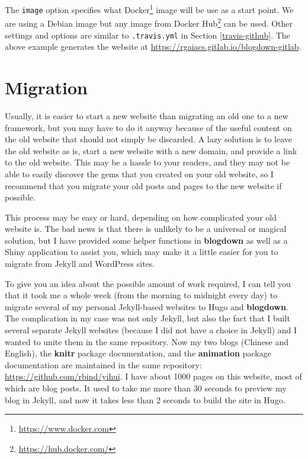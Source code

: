 \documentclass[12pt,]{krantz}
\renewcommand{\href}[2]{#2\footnote{\url{#1}}}
\theoremstyle{definition}
\theoremstyle{definition}
\theoremstyle{definition}
\theoremstyle{remark}
\begin{document}
The \texttt{image} option specifies what
\href{https://www.docker.com}{Docker} image will be use as a start
point. We are using a Debian image but any image from
\href{https://hub.docker.com/}{Docker Hub} can be used. Other settings
and options are similar to \texttt{.travis.yml} in Section
\ref{travis-github}. The above example generates the website at
\url{https://rgaiacs.gitlab.io/blogdown-gitlab}.

\chapter{Migration}\label{migration}

Usually, it is easier to start a new website than
migrating an old one to a new framework, but you
may have to do it anyway because of the useful content on the old
website that should not simply be discarded. A lazy solution is to leave
the old website as is, start a new website with a new domain, and
provide a link to the old website. This may be a hassle to your readers,
and they may not be able to easily discover the gems that you created on
your old website, so I recommend that you migrate your old posts and
pages to the new website if possible.

This process may be easy or hard, depending on how complicated your old
website is. The bad news is that there is unlikely to be a universal or
magical solution, but I have provided some helper functions in
\textbf{blogdown} as well as a Shiny application to assist you, which
may make it a little easier for you to migrate from Jekyll and WordPress
sites.

To give you an idea about the possible amount of work required, I can
tell you that it took me a whole week (from the morning to midnight
every day) to migrate several of my personal Jekyll-based websites to
Hugo and \textbf{blogdown}. The complication in my case was not only
Jekyll, but also the fact that I built several separate Jekyll websites
(because I did not have a choice in Jekyll) and I wanted to unite them
in the same repository. Now my two blogs (Chinese and English), the
\textbf{knitr} \citep{R-knitr} package documentation, and the
\textbf{animation} package \citep{R-animation} documentation are
maintained in the same repository: \url{https://github.com/rbind/yihui}.
I have about 1000 pages on this website, most of which are blog posts.
It used to take me more than 30 seconds to preview my blog in Jekyll,
and now it takes less than 2 seconds to build the site in Hugo.
\end{document}
